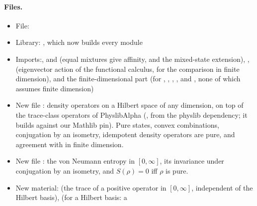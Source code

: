 \documentclass[11pt]{article}
\begin{document}
\paragraph{Files.}\leavevmode
\begin{itemize}
\item File: 
\item Library: , which now builds every module 
\item Imports:\newline {},\newline
   and 
  (equal mixtures give affinity, and the mixed-state extension),\newline
  ,\newline
   (eigenvector action of
  the functional calculus, for the comparison in finite dimension),\newline
  and the finite-dimensional part  (for , ,
  , ,  and
  , none of which assumes finite dimension)
\item New file : density operators on a
  Hilbert space of any dimension, on top of the trace-class operators of PhyslibAlpha
  (, from the physlib
  dependency; it builds against our Mathlib pin). Pure states, convex combinations, conjugation
  by an isometry, idempotent density operators are pure, and agreement with  in
  finite dimension.
\item New file : the von Neumann entropy
  in $[0,\infty]$, its invariance under conjugation by an isometry, and $S(\rho) = 0$ iff $\rho$
  is pure.
\item New  material:\newline
   (the trace of a positive
  operator in $[0,\infty]$, independent of the Hilbert basis),\newline
   (for a Hilbert basis: a

\end{itemize}
\end{document}
